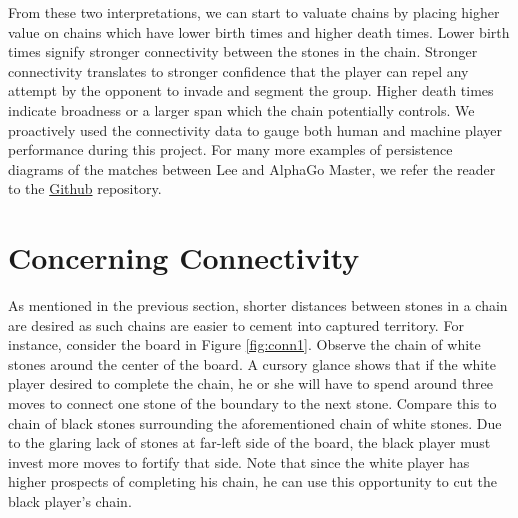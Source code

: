 \documentclass[11pt]{article}
\begin{document}
From these two interpretations, we can start to valuate chains by placing higher value on chains which have lower birth times and higher death times. Lower birth times signify stronger connectivity between the stones in the chain. Stronger connectivity translates to stronger confidence that the player can repel any attempt by the opponent to invade and segment the group. Higher death times indicate broadness or a larger span which the chain potentially controls. We proactively used the connectivity data to gauge both human and machine player performance during this project. For many more examples of persistence diagrams of the matches between Lee and AlphaGo Master, we refer the reader to the \href{https://github.com/ekim1919/TDAGo/tree/master/results/LSDAlpha}{Github} repository.

\section{Concerning Connectivity}

As mentioned in the previous section, shorter distances between stones in a chain are desired as such chains are easier to cement into captured territory. For instance, consider the board in Figure \ref{fig:conn1}. Observe the chain of white stones around the center of the board. A cursory glance shows that if the white player desired to complete the chain, he or she will have to spend around three moves to connect one stone of the boundary to the next stone. Compare this to chain of black stones surrounding the aforementioned chain of white stones. Due to the glaring lack of stones at far-left side of the board, the black player must invest more moves to fortify that side. Note that since the white player has higher prospects of completing his chain, he can use this opportunity to cut the black player's chain.
\end{document}
